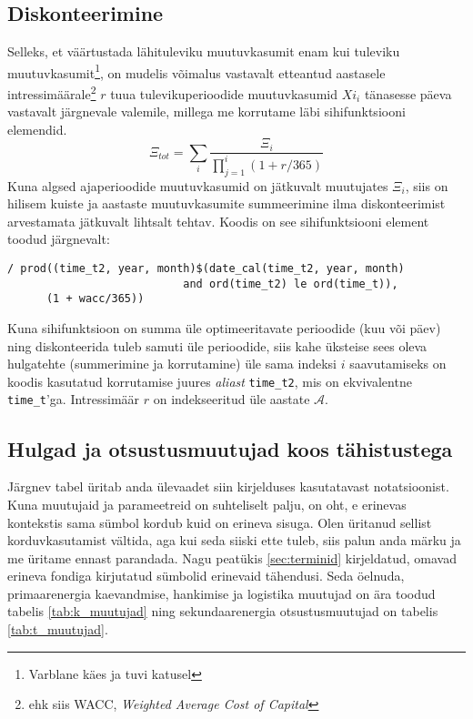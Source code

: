 \documentclass[10pt,a4paper]{article}
\begin{document}
\subsection{Diskonteerimine}
Selleks, et väärtustada lähituleviku muutuvkasumit enam kui tuleviku muutuvkasumit\footnote{Varblane käes ja tuvi katusel}, on mudelis võimalus vastavalt etteantud aastasele intressimäärale\footnote{ehk siis WACC, \emph{Weighted Average Cost of Capital}} $r$ tuua tulevikuperioodide muutuvkasumid $Xi_i$ tänasesse päeva vastavalt järgnevale valemile, millega me korrutame läbi sihifunktsiooni elemendid.
\begin{equation}
\Xi_{tot} = \sum_i \frac{\Xi_i}{\prod_{j=1}^i(1+r/365)}
\end{equation}
Kuna algsed ajaperioodide muutuvkasumid on jätkuvalt muutujates $\Xi_i$, siis on hilisem kuiste ja aastaste muutuvkasumite summeerimine ilma diskonteerimist arvestamata jätkuvalt lihtsalt tehtav.
Koodis on see sihifunktsiooni element toodud järgnevalt:
\begin{verbatim}
/ prod((time_t2, year, month)$(date_cal(time_t2, year, month)
                           and ord(time_t2) le ord(time_t)),
      (1 + wacc/365))
\end{verbatim}
Kuna sihifunktsioon on summa üle optimeeritavate perioodide (kuu või päev) ning diskonteerida tuleb samuti üle perioodide, siis kahe üksteise sees oleva hulgatehte (summerimine ja korrutamine) üle sama indeksi $i$ saavutamiseks on koodis kasutatud korrutamise juures \emph{aliast} \texttt{time\_t2}, mis on ekvivalentne \texttt{time\_t}'ga. Intressimäär $r$ on indekseeritud üle aastate $\mathcal{A}$.

\subsection{Hulgad ja otsustusmuutujad koos tähistustega}
Järgnev tabel üritab anda ülevaadet siin kirjelduses kasutatavast notatsioonist. Kuna muutujaid ja parameetreid on suhteliselt palju, on oht, e erinevas kontekstis sama sümbol kordub kuid on erineva sisuga. Olen üritanud sellist korduvkasutamist vältida, aga kui seda siiski ette tuleb, siis palun anda märku ja me üritame ennast parandada. Nagu peatükis \ref{sec:terminid} kirjeldatud, omavad erineva fondiga kirjutatud sümbolid erinevaid tähendusi. Seda öelnuda, primaarenergia kaevandmise, hankimise ja logistika muutujad on ära toodud tabelis \ref{tab:k_muutujad} ning sekundaarenergia otsustusmuutujad on tabelis \ref{tab:t_muutujad}.
\end{document}
